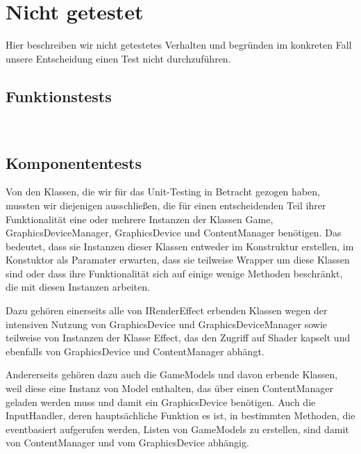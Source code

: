 %



\newpage



\section{Nicht getestet}
\label{Abschnitt:Tests:Nicht}

Hier beschreiben wir nicht getestetes Verhalten und begründen im konkreten Fall unsere Entscheidung einen Test nicht durchzuführen.
~\\




\subsection*{Funktionstests}
\label{Abschnitt:Tests:Nicht:Funktion}

~\\




\subsection*{Komponententests}
\label{Abschnitt:Tests:Nicht:Komponenten}

Von den Klassen, die wir für das Unit-Testing in Betracht gezogen haben, mussten wir diejenigen ausschließen, die für einen entscheidenden Teil ihrer Funktionalität eine oder mehrere Instanzen der Klassen Game, GraphicsDeviceManager, GraphicsDevice und ContentManager benötigen. Das bedeutet, dass sie Instanzen dieser Klassen entweder im Konstruktur erstellen, im Konstuktor als Paramater erwarten, dass sie teilweise Wrapper um diese Klassen sind oder dass ihre Funktionalität sich auf einige wenige Methoden beschränkt, die mit diesen Instanzen arbeiten.

Dazu gehören einerseits alle von IRenderEffect erbenden Klassen wegen der intensiven Nutzung von GraphicsDevice und GraphicsDeviceManager sowie teilweise von Instanzen der Klasse Effect, das den Zugriff auf Shader kapselt und ebenfalls von GraphicsDevice und ContentManager abhängt.

Andererseits gehören dazu auch die GameModels und davon erbende Klassen, weil diese eine Instanz von Model enthalten, das über einen ContentManager geladen werden muss und damit ein GraphicsDevice benötigen. Auch die InputHandler, deren hauptsächliche Funktion es ist, in bestimmten Methoden, die eventbasiert aufgerufen werden, Listen von GameModels zu erstellen, sind damit von ContentManager und vom GraphicsDevice abhängig.
~\\



